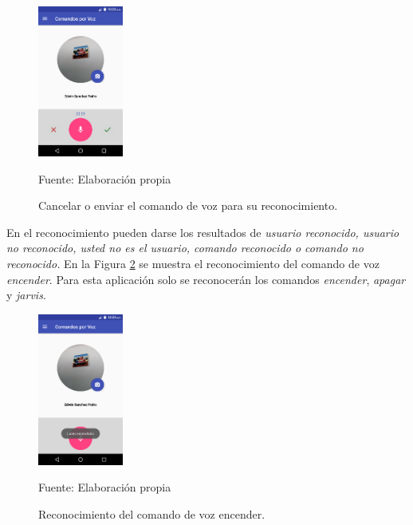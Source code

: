 \begin{figure}[H]
\captionsetup{justification=centering}
\begin{center}
\includegraphics[width=0.25\textwidth]{Imagenes/Cap3/image050}
\end{center}
\begin{center}
\vskip -0.5cm
\caption{\small{Cancelar o enviar el comando de voz para su reconocimiento.}}
\label{fig:figura3.50}
{\small{Fuente: Elaboración propia}}
\end{center}
\end{figure}
\vskip -0.5cm
En el reconocimiento pueden darse los resultados de \textit{usuario reconocido, usuario no reconocido, usted no es el usuario, comando reconocido o comando no reconocido.} En la Figura \ref{fig:figura3.51} se muestra el reconocimiento del comando de voz \textit{encender}. Para esta aplicación solo se reconocerán los comandos \textit{encender}, \textit{apagar} y \textit{jarvis}.
\begin{figure}[H]
\captionsetup{justification=centering}
\begin{center}
\includegraphics[width=0.25\textwidth]{Imagenes/Cap3/image051}
\end{center}
\begin{center}
\vskip -0.5cm
\caption{\small{Reconocimiento del comando de voz encender.}}
\label{fig:figura3.51}
{\small{Fuente: Elaboración propia}}
\end{center}
\end{figure}
